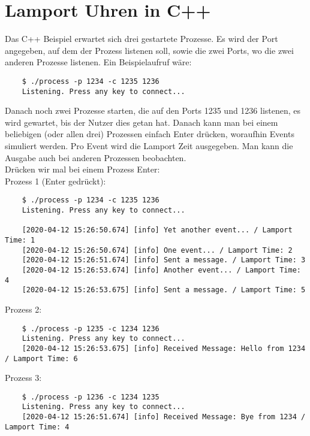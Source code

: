 \documentclass[a4paper,11pt]{report}
\begin{document}
\section{Lamport Uhren in C++}
Das C++ Beispiel erwartet sich drei gestartete Prozesse. Es wird der Port angegeben, auf dem der Prozess listenen soll, sowie die zwei Ports, wo die zwei anderen Prozesse listenen. Ein Beispielaufruf wäre:
\begin{verbatim}
    $ ./process -p 1234 -c 1235 1236
    Listening. Press any key to connect...
\end{verbatim}
Danach noch zwei Prozesse starten, die auf den Ports 1235 und 1236 listenen, es wird gewartet, bis der Nutzer dies getan hat. Danach kann man bei einem beliebigen (oder allen drei) Prozessen einfach Enter drücken, woraufhin Events simuliert werden. Pro Event wird die Lamport Zeit ausgegeben. Man kann die Ausgabe auch bei anderen Prozessen beobachten.\\
Drücken wir mal bei einem Prozess Enter:\\
Prozess 1 (Enter gedrückt):
\begin{verbatim}
    $ ./process -p 1234 -c 1235 1236
    Listening. Press any key to connect...

    [2020-04-12 15:26:50.674] [info] Yet another event... / Lamport Time: 1
    [2020-04-12 15:26:50.674] [info] One event... / Lamport Time: 2
    [2020-04-12 15:26:51.674] [info] Sent a message. / Lamport Time: 3
    [2020-04-12 15:26:53.674] [info] Another event... / Lamport Time: 4
    [2020-04-12 15:26:53.675] [info] Sent a message. / Lamport Time: 5
\end{verbatim}
Prozess 2:
\begin{verbatim}
    $ ./process -p 1235 -c 1234 1236
    Listening. Press any key to connect...
    [2020-04-12 15:26:53.675] [info] Received Message: Hello from 1234 / Lamport Time: 6
\end{verbatim}
Prozess 3:
\begin{verbatim}
    $ ./process -p 1236 -c 1234 1235
    Listening. Press any key to connect...
    [2020-04-12 15:26:51.674] [info] Received Message: Bye from 1234 / Lamport Time: 4
\end{verbatim}
\end{document}
